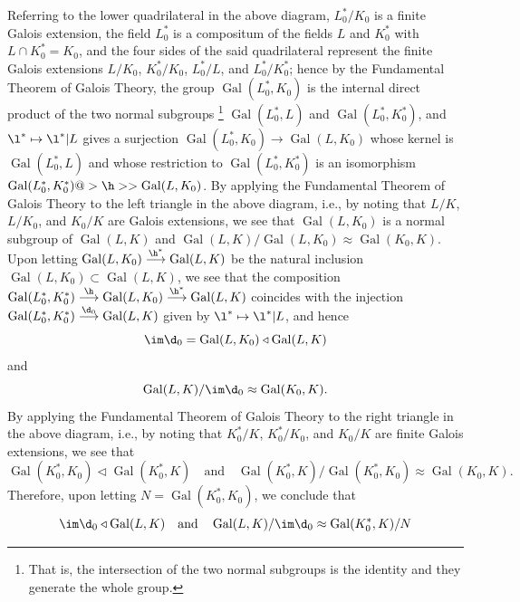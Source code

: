 Referring to the lower quadrilateral in the above diagram, 
$L^*_0/K_0$ is a 
finite Galois extension, the field $L^*_0$ 
is a compositum of the fields $L$ and 
$K^*_0$ with $L\cap K^*_0=K_0$, and the four sides of the 
said quadrilateral 
represent the finite Galois extensions $L/K_0$, 
$K^*_0/K_0$, $L^*_0/L$, and 
$L^*_0/K^*_0$; hence by the Fundamental Theorem of Galois 
Theory, the group 
$\operatorname{Gal}(L^*_0,K_0)$ is the internal direct 
product of the two normal subgroups
\footnote{That is, the intersection of the two normal 
subgroups is the identity
and they generate the whole group.}
$\operatorname{Gal}(L^*_0,L)$ and 
$\operatorname{Gal}(L^*_0,K^*_0)$, and $\l^*\mapsto\l^*|L$ 
gives a
surjection 
$\operatorname{Gal}(L^*_0,K_0)\to
\operatorname{Gal}(L,K_0)$ whose kernel is 
$\operatorname{Gal}(L^*_0,L)$
and whose restriction to 
$\operatorname{Gal}(L^*_0,K^*_0)$ is an 
isomorphism$\operatorname{Gal}(L^*_0,K^*_0)@>\h>>%
\operatorname{Gal}(L,K_0)$. By applying the Fundamental 
Theorem of Galois Theory to the left triangle in the above 
diagram, i.e., by 
noting that $L/K$, $L/K_0$, and $K_0/K$ are Galois 
extensions, we see that 
$\operatorname{Gal}(L,K_0)$ is a normal subgroup of 
$\operatorname{Gal}(L,K)$ and 
$\operatorname{Gal}(L,K)/\operatorname{Gal}(L,K_0)\approx%
\operatorname{Gal}(K_0,K)$. Upon letting
$\operatorname{Gal}(L,K_0)
\buildrel{\h^*}\over{\longrightarrow}
\operatorname{Gal}(L,K)$ 
be the natural inclusion
$\operatorname{Gal}(L,K_0)\subset\operatorname{Gal}(L,K)$, 
we see that the 
composition 
$\operatorname{Gal}(L^*_0,K^*_0)
\buildrel{\h}\over{\longrightarrow}
\operatorname{Gal}(L,K_0)
\buildrel{\h^\ast}\over{\longrightarrow}
\operatorname{Gal}(L,K)$ 
coincides with the injection
$\operatorname{Gal}(L^*_0,K^*_0)
\buildrel{\d_0}\over{\longrightarrow}
\operatorname{Gal}(L,K)$
given by $\l^*\mapsto\l^*|L$, and hence
$$
\im\d_0=\operatorname{Gal}(L,K_0)\triangleleft%
\operatorname{Gal}(L,K)
$$
and
$$
\operatorname{Gal}(L,K)/\im\d_0\approx%
\operatorname{Gal}(K_0,K).
$$
By applying the Fundamental Theorem of Galois Theory to 
the right triangle in the above diagram, i.e., by noting 
that $K^*_0/K$,
$K^*_0/K_0$, and $K_0/K$ are finite Galois extensions, we 
see that
$$
\operatorname{Gal}(K^*_0,K_0)\triangleleft%
\operatorname{Gal}(K^*_0,K)
\quad\text{and}\quad
\operatorname{Gal}(K^*_0,K)/\operatorname{Gal}(K^*_0,K_0)
\approx\operatorname{Gal}(K_0,K).
$$
Therefore, upon letting $N=\operatorname{Gal}(K^*_0,K_0)$, 
we conclude that
$$
\im\d_0\triangleleft\operatorname{Gal}(L,K)\quad\text{and}%
\quad
\operatorname{Gal}(L,K)/\im\d_0\approx%
\operatorname{Gal}(K^*_0,K)/N
$$
